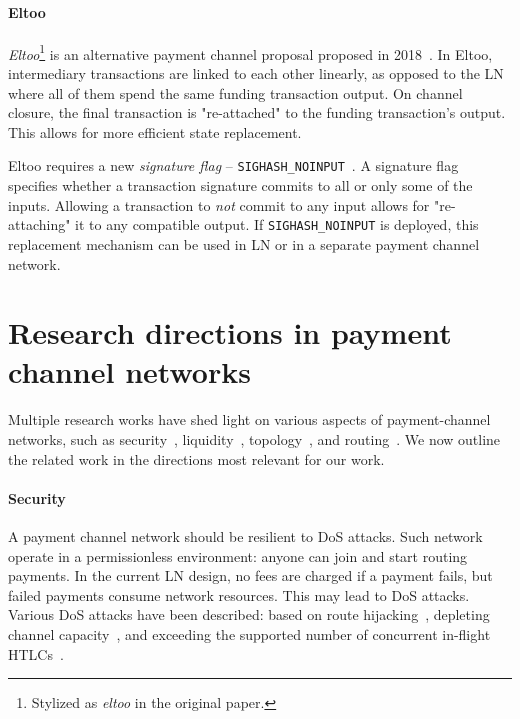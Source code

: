 \paragraph{Eltoo}

\textit{Eltoo}\footnote{Stylized as \textit{eltoo} in the original paper.} is an alternative payment channel proposal proposed in 2018~\cite{Decker2018}.
In Eltoo, intermediary transactions are linked to each other linearly, as opposed to the LN where all of them spend the same funding transaction output.
On channel closure, the final transaction is "re-attached" to the funding transaction's output.
This allows for more efficient state replacement.

Eltoo requires a new \textit{signature flag} -- \texttt{SIGHASH\_NOINPUT}~\cite{Decker2017}.
A signature flag specifies whether a transaction signature commits to all or only some of the inputs.
Allowing a transaction to \textit{not} commit to any input allows for "re-attaching" it to any compatible output.
If \texttt{SIGHASH\_NOINPUT} is deployed, this replacement mechanism can be used in LN or in a separate payment channel network.


\section{Research directions in payment channel networks}

Multiple research works have shed light on various aspects of payment-channel networks, such as security~\cite{Malavolta2019, Kiayias2019},  liquidity~\cite{Dandekar2011, MorenoSanchez2018, Conoscenti2019}, topology~\cite{Martinazzi2019, Seres2019}, and routing~\cite{Engelmann2017, Prihodko2016, Malavolta2017a, Grunspan2018, Osuntokun2018, Piatkivskyi2018, Roos2018, Sivaraman2018, Bagaria2019, Pickhardt2019, Pickhardt2019a, ZmnSCPxj2019, ZmnSCPxj2019a, ZmnSCPxj2019b}.
We now outline the related work in the directions most relevant for our work.

\paragraph{Security}
A payment channel network should be resilient to DoS attacks.
Such network operate in a permissionless environment: anyone can join and start routing payments.
In the current LN design, no fees are charged if a payment fails, but failed payments consume network resources.
This may lead to DoS attacks.
Various DoS attacks have been described: based on route hijacking~\cite{Tochner2019}, depleting channel capacity~\cite{PerezSola2019}, and exceeding the supported number of concurrent in-flight HTLCs~\cite{Mizrahi2020}.

